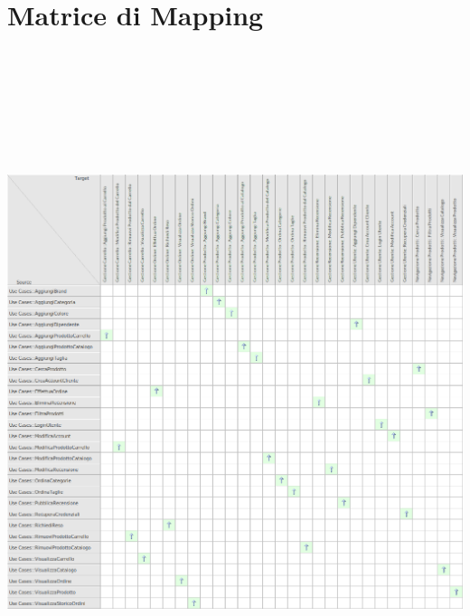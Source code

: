 \newpage\section{Matrice di Mapping}
\label{sec:MatriceDiMapping}
\begin{center}
  \includegraphics[width=\textwidth, height=20cm, keepaspectratio]{immagini/GestioneDeiRequisiti/MatriceDiMapping.png}
\end{center}